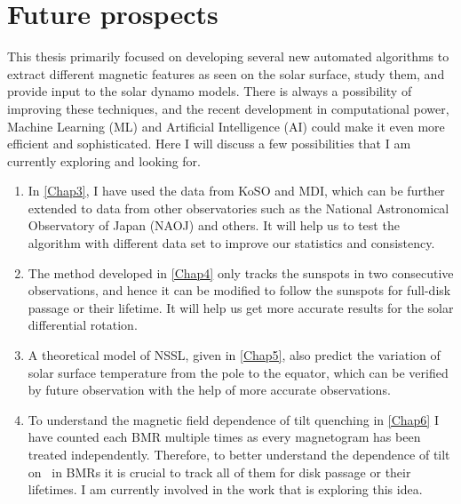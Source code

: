 \section{Future prospects}

This thesis primarily focused on developing several new automated algorithms to extract different magnetic features as seen on the solar surface, study them, and provide input to the solar dynamo models. There is always a possibility of improving these techniques, and the recent development in computational power, Machine Learning (ML) and Artificial Intelligence (AI) could make it even more efficient and sophisticated. Here I will discuss a few possibilities that I am currently exploring and looking for.

\begin{enumerate}
    \item In \cref{Chap3}, I have used the data from KoSO and MDI, which can be further extended to data from other observatories such as the National Astronomical Observatory of Japan (NAOJ) and others. It will help us to test the algorithm with different data set to improve our statistics and consistency.
    
    \item The method developed in \cref{Chap4} only tracks the sunspots in two consecutive observations, and hence it can be modified to follow the sunspots for full-disk passage or their lifetime. It will help us get more accurate results for the solar differential rotation.
    
    \item A theoretical model of NSSL, given in \cref{Chap5}, also predict the variation of solar surface temperature from the pole to the equator, which can be verified by future observation with the help of more accurate observations.
    
    \item To understand the magnetic field dependence of tilt quenching in \cref{Chap6} I have counted each BMR multiple times as every magnetogram has been treated independently. Therefore,  to better understand the dependence of tilt on \Bmax\ in BMRs it is crucial to track all of them for disk passage or their lifetimes. I am currently involved in the work that is exploring this idea.
\end{enumerate}
